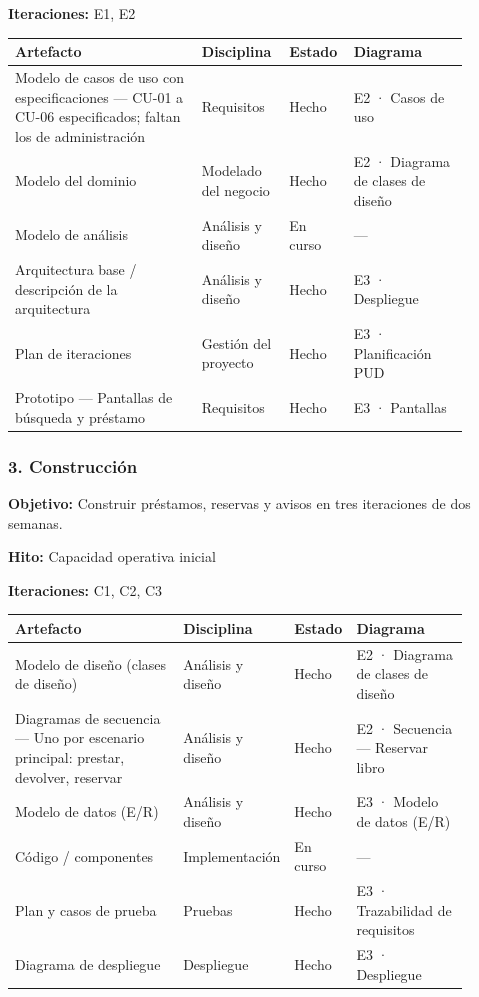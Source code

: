 \textbf{Iteraciones:} E1, E2

{\small
\begin{longtable}{@{}>{\raggedright\arraybackslash}p{0.396\linewidth}>{\raggedright\arraybackslash}p{0.167\linewidth}>{\raggedright\arraybackslash}p{0.091\linewidth}>{\raggedright\arraybackslash}p{0.244\linewidth}@{}}
\toprule
\textbf{Artefacto} & \textbf{Disciplina} & \textbf{Estado} & \textbf{Diagrama} \\
\midrule
\endhead
Modelo de casos de uso con especificaciones — CU-01 a CU-06 especificados; faltan los de administración & Requisitos & Hecho & E2 · Casos de uso \\
Modelo del dominio & Modelado del negocio & Hecho & E2 · Diagrama de clases de diseño \\
Modelo de análisis & Análisis y diseño & En curso & — \\
Arquitectura base / descripción de la arquitectura & Análisis y diseño & Hecho & E3 · Despliegue \\
Plan de iteraciones & Gestión del proyecto & Hecho & E3 · Planificación PUD \\
Prototipo — Pantallas de búsqueda y préstamo & Requisitos & Hecho & E3 · Pantallas \\
\bottomrule
\end{longtable}}

\subsubsection*{3. Construcción}

\textbf{Objetivo:} Construir préstamos, reservas y avisos en tres iteraciones de dos semanas.

\textbf{Hito:} Capacidad operativa inicial

\textbf{Iteraciones:} C1, C2, C3

{\small
\begin{longtable}{@{}>{\raggedright\arraybackslash}p{0.380\linewidth}>{\raggedright\arraybackslash}p{0.172\linewidth}>{\raggedright\arraybackslash}p{0.091\linewidth}>{\raggedright\arraybackslash}p{0.254\linewidth}@{}}
\toprule
\textbf{Artefacto} & \textbf{Disciplina} & \textbf{Estado} & \textbf{Diagrama} \\
\midrule
\endhead
Modelo de diseño (clases de diseño) & Análisis y diseño & Hecho & E2 · Diagrama de clases de diseño \\
Diagramas de secuencia — Uno por escenario principal: prestar, devolver, reservar & Análisis y diseño & Hecho & E2 · Secuencia — Reservar libro \\
Modelo de datos (E/R) & Análisis y diseño & Hecho & E3 · Modelo de datos (E/R) \\
Código / componentes & Implementación & En curso & — \\
Plan y casos de prueba & Pruebas & Hecho & E3 · Trazabilidad de requisitos \\
Diagrama de despliegue & Despliegue & Hecho & E3 · Despliegue \\
\bottomrule
\end{longtable}}

